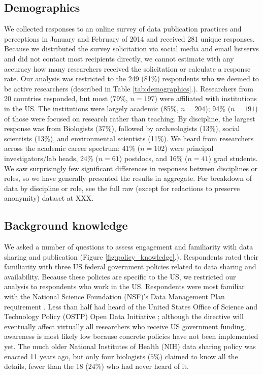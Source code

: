\documentclass[10pt]{article}
\begin{document}
\subsection*{Demographics}

We collected responses to an online survey of data publication practices and perceptions in January and February of 2014 and received 281 unique responses.
Because we distributed the survey solicitation via social media and email listservs and did not contact most recipients directly, we cannot estimate with any accuracy how many researchers received the solicitation or calculate a response rate.
Our analysis was restricted to the 249 (81\%) respondents who we deemed to be active researchers (described in Table \ref{tab:demographics}.).
Researchers from 20 countries responded, but most (79\%, $n=197$) were affiliated with institutions in the US.
The institutions were largely academic (85\%, $n=204$); 94\% ($n=191$) of those were focused on research rather than teaching. 
By discipline, the largest response was from Biologists (37\%), followed by arch{\ae}ologists (13\%), social scientists (13\%), and environmental scientists (11\%).
We heard from researchers across the academic career spectrum: 41\% ($n=102$) were principal investigators/lab heads, 24\% ($n=61$) postdocs, and 16\% ($n=41$) grad students.
We saw surprisingly few significant differences in responses between disciplines or roles, so we have generally presented the results in aggregate.
For breakdown of data by discipline or role, see the full raw (except for redactions to preserve anonymity) dataset at XXX. %

\subsection*{Background knowledge}

We asked a number of questions to assess engagement and familiarity with data sharing and publication (Figure \ref{fig:policy_knowledge}.).
Respondents rated their familiarity with three US federal government policies related to data sharing and availability.
Because these policies are specific to the US, we restricted our analysis to respondents who work in the US.
Respondents were most familiar with the National Science Foundation (NSF)'s Data Management Plan requirement \cite{national_science_foundation_gpg_2011}.
Less than half had heard of the United States Office of Science and Technology Policy (OSTP) Open Data Initiative \cite{obama_making_2013}; although the directive will eventually affect virtually all researchers who receive US government funding, awareness is most likely low because concrete policies have not been implemented yet. 
The much older National Institutes of Health (NIH) data sharing policy \cite{national_institutes_of_health_final_2003} was enacted 11 years ago, but only four biologists ($5\%$) claimed to know all the details, fewer than the 18 ($24\%$) who had never heard of it.
\end{document}
